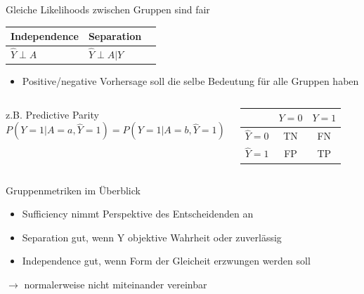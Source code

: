 \documentclass[aspectratio=169]{beamer}
\begin{document}
\begin{frame}[t]{Gleiche Likelihoods zwischen Gruppen sind fair}
	\vspace*{0.3cm} %
	\begin{table}
		\begin{tabular}{lll}
			\toprule
			Independence & Separation & \color{orange}{Sufficiency} \\
			\midrule
			$\hat{Y} \perp A$ & $\hat{Y} \perp A | Y$ & \color{orange}{$Y \perp A | \hat{Y}$}\\
			\bottomrule
		\end{tabular}
	\end{table}
	\begin{itemize}
		\item Positive/negative Vorhersage soll die selbe Bedeutung für alle Gruppen haben
	\end{itemize}
	\begin{columns}
		\centering
		z.B. Predictive Parity \\
		\centering
		$$P(Y = 1 | A = a, \hat{Y} = 1) = P(Y = 1 | A = b, \hat{Y} = 1)$$
		\begin{center}
			\renewcommand{\arraystretch}{1.5}  %
			\begin{tabular}{c|c|c|}
				& \(Y = 0\) & \(Y = 1\) \\
				\hline
				\color{orange}\(\hat{Y} = 0\) & TN & FN \\
				\hline
				\color{orange}\(\hat{Y} = 1\) & FP & TP \\
				\hline
			\end{tabular}
		\end{center}
	\end{columns}
\end{frame}

\begin{frame}{Gruppenmetriken im Überblick}
	\begin{itemize}
		\item Sufficiency nimmt Perspektive des Entscheidenden an
		\item Separation gut, wenn Y objektive Wahrheit oder zuverlässig
		\item Independence gut, wenn Form der Gleicheit erzwungen werden soll
	\end{itemize}
	$\rightarrow$ normalerweise nicht miteinander vereinbar
\end{frame}
\end{document}
